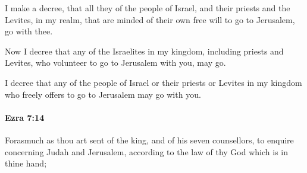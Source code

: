 			\begin{versebox}
					\item[BHS] 
					\item[LXX] 
					\item[ASV] I make a decree, that all they of the people of Israel, and their priests and the Levites, in my realm, that are minded of their own free will to go to Jerusalem, go with thee.
					\item[NIV] Now I decree that any of the Israelites in my kingdom, including priests and Levites, who volunteer to go to Jerusalem with you, may go.
					\item[NRSV] I decree that any of the people of Israel or their priests or Levites in my kingdom who freely offers to go to Jerusalem may go with you.
			\end{versebox}

		\paragraph{Ezra 7:14} %
			\label{EZRA-7-14}

			Forasmuch as thou art sent of the king, and of his seven counsellors, to enquire concerning Judah and Jerusalem, according to the law of thy God which is in thine hand;

